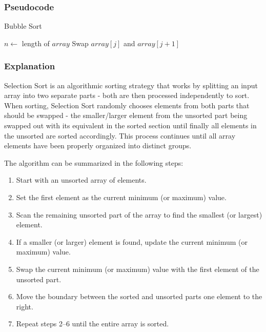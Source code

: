 \documentclass{article}
\begin{document}
\subsubsection{Pseudocode}


\begin{algorithm}
\caption{Bubble Sort}
\begin{algorithmic}[1]
    \State $n \gets$ length of $array$
                \State Swap $array[j]$ and $array[j+1]$
            \EndIf
        \EndFor
    \EndFor
\EndProcedure
\end{algorithmic}
\end{algorithm}

\subsubsection{Explanation}


Selection Sort is an algorithmic sorting strategy that works by splitting an input array into two separate parts - both are then processed independently to sort. When sorting, Selection Sort randomly chooses elements from both parts that should be swapped - the smaller/larger element from the unsorted part being swapped out with its equivalent in the sorted section until finally all elements in the unsorted are sorted accordingly. This process continues until all array elements have been properly organized into distinct groups.

The algorithm can be summarized in the following steps:

\begin{enumerate}
    \item Start with an unsorted array of elements.
    \item Set the first element as the current minimum (or maximum) value.
    \item Scan the remaining unsorted part of the array to find the smallest (or largest) element.
    \item If a smaller (or larger) element is found, update the current minimum (or maximum) value.
    \item Swap the current minimum (or maximum) value with the first element of the unsorted part.
    \item Move the boundary between the sorted and unsorted parts one element to the right.
    \item Repeat steps 2--6 until the entire array is sorted.
\end{enumerate}
\end{document}
